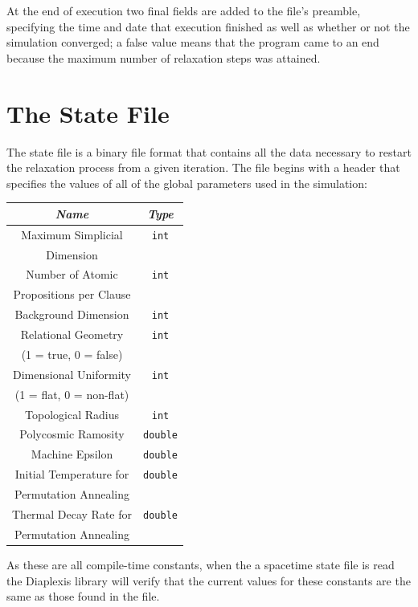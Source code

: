 \documentclass[12pt,letterpaper]{report}
\begin{document}
At the end of execution two final fields are added to the file's preamble, specifying the time and date 
that execution finished as well as whether or not the simulation converged; a false value means that the 
program came to an end because the maximum number of relaxation steps was attained. 
   
\section{The State File}

The state file is a binary file format that contains all the data necessary to restart the relaxation 
process from a given iteration. The file begins with a header that specifies the values of all of the 
global parameters used in the simulation:
\begin{center}
\begin{tabular}{|c|c|}
\hline 
\emph{Name} & \emph{Type} \\ \hline
Maximum Simplicial & \texttt{int}\\
Dimension & \\ \hline
Number of Atomic & \texttt{int} \\
Propositions per Clause & \\ \hline
Background Dimension & \texttt{int} \\ \hline
Relational Geometry & \texttt{int} \\
(1 = true, 0 = false) & \\ \hline
Dimensional Uniformity & \texttt{int} \\ 
(1 = flat, 0 = non-flat) & \\ \hline
Topological Radius & \texttt{int} \\ \hline 
Polycosmic Ramosity & \texttt{double} \\ \hline 
Machine Epsilon  & \texttt{double} \\ \hline
Initial Temperature for & \texttt{double} \\ 
Permutation Annealing & \\ \hline
Thermal Decay Rate for & \texttt{double} \\ 
Permutation Annealing & \\ \hline 
\end{tabular} 
\end{center}
As these are all compile-time constants, when the a spacetime state file is read the Diaplexis library will 
verify that the current values for these constants are the same as those found in the file.   
\end{document}
